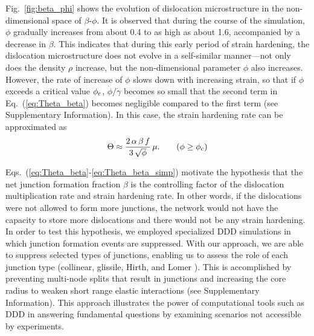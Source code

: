 \documentclass[%
reprint,
 amsmath,amssymb,
 aps,
superscriptaddress,
]{revtex4-1}
\begin{document}
Fig.~\ref{fig:beta_phi} shows the evolution of dislocation microstructure in the
non-dimensional space of $\beta$-$\phi$.
%
It is observed that during the course of the simulation, $\phi$ gradually 
increases from about 0.4 to as high as about 1.6, accompanied by a decrease in $\beta$.
%
This indicates that during this early period of strain hardening, the 
dislocation microstructure does not evolve in a self-similar manner---not only does
the density $\rho$ increase, but the non-dimensional parameter $\phi$ also 
increases.
%
However, the rate of increase of $\phi$ slows down with increasing strain, so
that if $\phi$ exceeds a critical value $\phi_{\rm c}$,
$\dot{\phi}/\dot{\gamma}$ becomes so small that the second term in
Eq.~(\ref{eq:Theta_beta}) becomes negligible compared to the first term (see
Supplementary Information).
%
In this case, the strain hardening rate can be approximated as
%
\begin{equation}
  \Theta \approx \frac{2\, \alpha\, \beta\,f}{3\,\sqrt{\phi}} \,  \mu .  \quad 
  \quad (\phi \ge \phi_{\rm c})
      \label{eq:Theta_beta_simp}
\end{equation}
%


Eqs.~(\ref{eq:Theta_beta}-\ref{eq:Theta_beta_simp}) motivate the hypothesis that
the net junction formation fraction $\beta$ is the controlling factor of the
dislocation multiplication rate and strain hardening rate.
%
In other words, if the dislocations were not allowed to form more junctions, the 
network would not have the capacity to store more dislocations and there would 
not be any strain hardening.
%
In order to test this hypothesis, we employed specialized DDD simulations in
which junction formation events are suppressed.
%
With our approach, we are able to suppress selected types of junctions,
enabling us to assess the role of each junction type (collinear, glissile,
Hirth, and Lomer \cite{Hirth1961,Kubin2013B}).
%
This is accomplished by preventing multi-node splits that result in junctions
\cite{Bulatov2006B,Arsenlis2007} 
and increasing the core radius to weaken short range elastic interactions
(see Supplementary Information).
%
%
This approach illustrates the power of computational tools such as DDD in
answering fundamental questions by examining scenarios not accessible by
experiments.
\end{document}
